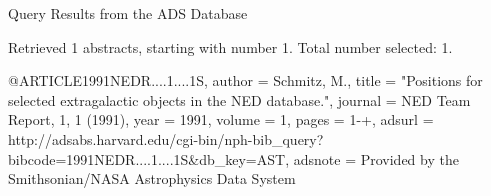 Query Results from the ADS Database


Retrieved 1 abstracts, starting with number 1.  Total number selected: 1.

@ARTICLE{1991NEDR....1....1S,
   author = {{Schmitz}, M.},
    title = "{Positions for selected extragalactic objects in the NED database.}",
  journal = {NED Team Report, 1, 1 (1991)},
     year = 1991,
   volume = 1,
    pages = {1-+},
   adsurl = {http://adsabs.harvard.edu/cgi-bin/nph-bib_query?bibcode=1991NEDR....1....1S&db_key=AST},
  adsnote = {Provided by the Smithsonian/NASA Astrophysics Data System}
}


